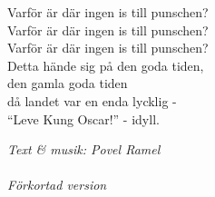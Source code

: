 \vspace{10pt}
Varför är där ingen is till punschen?\\
Varför är där ingen is till punschen?\\
Varför är där ingen is till punschen?\\
Detta hände sig på den goda tiden,\\
den gamla goda tiden\\
då landet var en enda lycklig -\\
``Leve Kung Oscar!'' - idyll.\par
\vspace{10pt}
{\footnotesize\textit{Text \& musik: Povel Ramel\\
\\
Förkortad version}}
